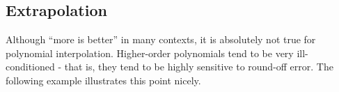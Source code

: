 \documentclass[../main.tex]{subfiles}
\begin{document}

\label{cha:cha_P_17_5_2} 
\subsection{Extrapolation}

\noindent Although ``more is better'' in many contexts, it is absolutely not true for polynomial interpolation. Higher-order polynomials tend to be very ill-conditioned - that is, they tend to be
highly sensitive to round-off error. The following example illustrates this point nicely.


\end{document}
